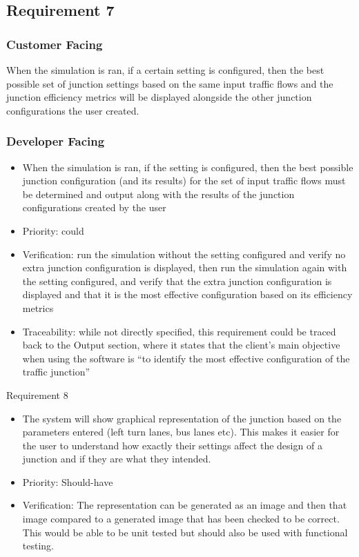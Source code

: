 \documentclass{article}
\begin{document}
\subsection{Requirement 7}
\subsubsection{Customer Facing}
When the simulation is ran, if a certain setting is configured, then the best 
possible set of junction settings based on the same input traffic flows and the 
junction efficiency metrics will be displayed alongside the other junction 
configurations the user created.
\subsubsection{Developer Facing}
\begin{itemize}
  \item When the simulation is ran, if the setting is configured, then the best 
  possible junction configuration (and its results) for the set of input traffic 
  flows must be determined and output along with the results of the junction 
  configurations created by the user
  \item Priority: could
  \item Verification: run the simulation without the setting configured and verify 
  no extra junction configuration is displayed, then run the simulation again with 
  the setting configured, and verify that the extra junction configuration is displayed 
  and that it is the most effective configuration based on its efficiency metrics
  \item Traceability: while not directly specified, this requirement could be traced back 
  to the Output section, where it states that the client’s main objective when using 
  the software is “to identify the most effective configuration of the traffic junction”
\end{itemize}

Requirement 8
\begin{itemize}
  \item The system will show graphical representation of the junction based on the parameters entered (left turn lanes, bus lanes etc). This makes it easier for the user to understand how exactly their settings affect the design of a junction and if they are what they intended.
  \item Priority: Should-have 
  \item Verification: The representation can be generated as an image and then that image compared to a generated image that has been checked to be correct. This would be able to be unit tested but should also be used  with functional testing.
\end{itemize}
\end{document}
